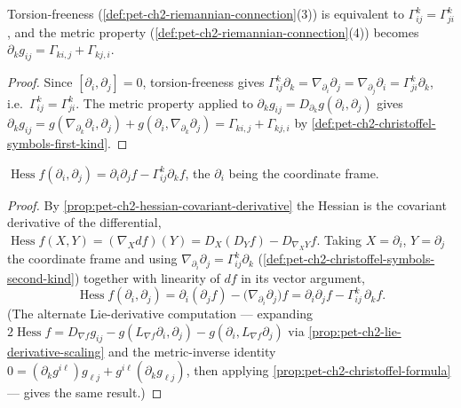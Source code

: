 \begin{proposition}
  \label{prop:pet-ch2-christoffel-symmetry-metric-property}
  \leanok
  Torsion-freeness (\cref{def:pet-ch2-riemannian-connection}(3)) is equivalent
  to $\Gamma^k_{ij}=\Gamma^k_{ji}$, and the metric property
  (\cref{def:pet-ch2-riemannian-connection}(4)) becomes
  $\partial_kg_{ij}=\Gamma_{ki,j}+\Gamma_{kj,i}$.
\end{proposition}
\begin{proof}
  \leanok
  Since $[\partial_i,\partial_j]=0$, torsion-freeness gives
  $\Gamma^k_{ij}\partial_k=\nabla_{\partial_i}\partial_j=\nabla_{\partial_j}\partial_i=\Gamma^k_{ji}\partial_k$,
  i.e.\ $\Gamma^k_{ij}=\Gamma^k_{ji}$. The metric property applied to
  $\partial_kg_{ij}=D_{\partial_k}g(\partial_i,\partial_j)$ gives
  $\partial_kg_{ij}=g(\nabla_{\partial_k}\partial_i,\partial_j)+g(\partial_i,\nabla_{\partial_k}\partial_j)
  =\Gamma_{ki,j}+\Gamma_{kj,i}$ by \cref{def:pet-ch2-christoffel-symbols-first-kind}.
\end{proof}

\begin{proposition}
  \label{prop:pet-ch2-hessian-coordinate-formula}
  \leanok
  $\operatorname{Hess}f(\partial_i,\partial_j)=\partial_i\partial_jf-\Gamma^k_{ij}\partial_kf$,
  the $\partial_i$ being the coordinate frame.
\end{proposition}
\begin{proof}
  \leanok
  By \cref{prop:pet-ch2-hessian-covariant-derivative} the Hessian is the
  covariant derivative of the differential,
  $\operatorname{Hess}f(X,Y)=(\nabla_Xdf)(Y)=D_X(D_Yf)-D_{\nabla_XY}f$. Taking
  $X=\partial_i$, $Y=\partial_j$ the coordinate frame and using
  $\nabla_{\partial_i}\partial_j=\Gamma^k_{ij}\partial_k$
  (\cref{def:pet-ch2-christoffel-symbols-second-kind}) together with linearity of
  $df$ in its vector argument,
  \[
    \operatorname{Hess}f(\partial_i,\partial_j)
      = \partial_i(\partial_jf)-\big(\nabla_{\partial_i}\partial_j\big)f
      = \partial_i\partial_jf-\Gamma^k_{ij}\,\partial_kf .
  \]
  (The alternate Lie-derivative computation — expanding
  $2\operatorname{Hess}f=D_{\nabla f}g_{ij}-g(L_{\nabla f}\partial_i,\partial_j)
  -g(\partial_i,L_{\nabla f}\partial_j)$ via
  \cref{prop:pet-ch2-lie-derivative-scaling} and the metric-inverse identity
  $0=(\partial_kg^{i\ell})g_{\ell j}+g^{i\ell}(\partial_kg_{\ell j})$, then applying
  \cref{prop:pet-ch2-christoffel-formula} — gives the same result.)
\end{proof}

